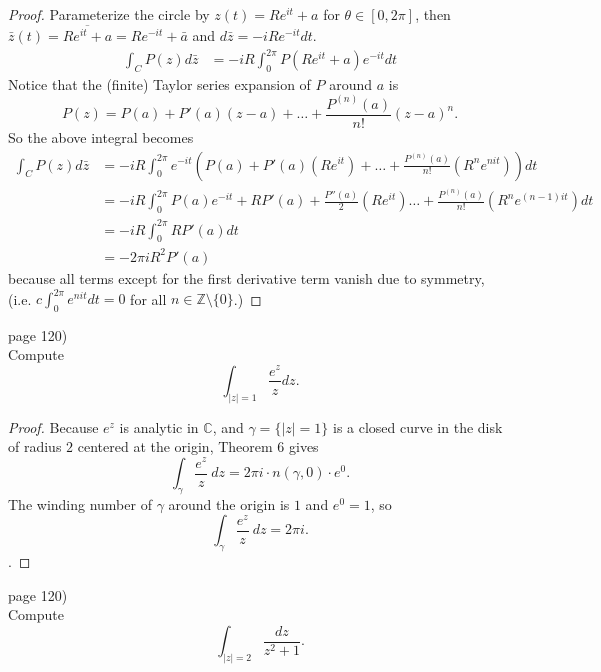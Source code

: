 \documentclass{article}
\newenvironment{problem}[2][Problem]{\begin{trivlist}
\item[\hskip \labelsep {\bfseries #1}\hskip \labelsep {\bfseries #2.}]}{\end{trivlist}}
\begin{document}
\begin{proof}
  Parameterize the circle by $z(t) = Re^{it} + a$ for $\theta \in [0, 2\pi]$,
  then $\bar{z}(t) = \overline{Re^{it} + a} = Re^{-it} + \bar{a}$ and
  $d\bar{z} = -iRe^{-it} dt$.
  \begin{align*}
    \int_C P(z) d\bar{z} &= -iR\int_{0}^{2\pi} P(Re^{it} + a)e^{-it} dt
  \end{align*}
  Notice that the (finite) Taylor series expansion of $P$ around $a$ is \[
    P(z) = P(a) + P'(a)(z-a) + \hdots + \frac{P^{(n)}(a)}{n!}(z - a)^n.
  \]
  So the above integral becomes \begin{align*}
    \int_C P(z) d\bar{z} &= -iR\int_{0}^{2\pi} e^{-it} \left(P(a) + P'(a)(Re^{it}) + \hdots + \frac{P^{(n)}(a)}{n!}(R^{n}e^{nit})\right) dt \\
    &= -iR\int_{0}^{2\pi} P(a)e^{-it} + RP'(a) + \frac{P''(a)}{2}(Re^{it}) \hdots + \frac{P^{(n)}(a)}{n!}(R^{n}e^{(n - 1)it}) dt \\
    &= -iR\int_{0}^{2\pi} RP'(a) dt \\
    &= -2\pi iR^2P'(a)
  \end{align*} because all terms except for the first derivative term vanish due
  to symmetry, (i.e. $c\int_0^{2\pi}e^{nit} dt = 0$ for all
  $n \in \mathbb{Z} \setminus \{0\}$.)
\end{proof}
\pagebreak

\begin{problem}{1} (page 120) \\
  Compute \[
    \int_{|z| = 1} \frac{e^z}{z} dz.
  \]
\end{problem}

\begin{proof}
  Because $e^z$ is analytic in $\mathbb{C}$, and $\gamma = \{|z| = 1\}$ is a
  closed curve in the disk of radius $2$ centered at the origin, Theorem 6 gives
  \[
    \int_\gamma \frac{e^z}{z}\ dz = 2\pi i \cdot n(\gamma, 0) \cdot e^0.
  \]
  The winding number of $\gamma$ around the origin is $1$ and $e^0 = 1$, so
  \[
    \int_\gamma \frac{e^z}{z}\ dz = 2\pi i.
  \].
\end{proof}

\pagebreak

\begin{problem}{3} (page 120) \\
  Compute \[
    \int_{|z|=2}\frac{dz}{z^2 + 1}.
  \]
\end{problem}
\end{document}

